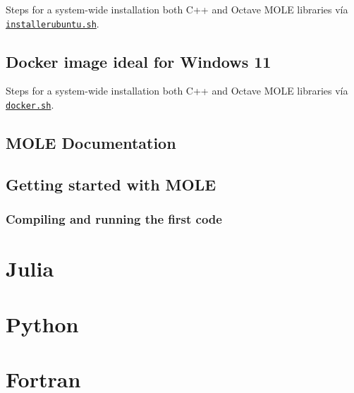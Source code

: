 \begin{listing}[ht!]
	\tiny
	\centering
	\caption{Steps for a system-wide installation both C++ and Octave
		MOLE libraries vía \href{https://raw.githubusercontent.com/carlosal1015/mole_examples/main/tutorial/installerubuntu.sh}{\texttt{installerubuntu.sh}}.}
	\label{code:installerubuntu.sh}
\end{listing}

\section{Docker image ideal for Windows 11}

\begin{listing}[ht!]
	\tiny
	\centering
	\caption{Steps for a system-wide installation both C++ and Octave
		MOLE libraries vía \href{https://raw.githubusercontent.com/carlosal1015/mole_examples/main/tutorial/docker.sh}{\texttt{docker.sh}}.}
	\label{code:docker.sh}
\end{listing}

\section{MOLE Documentation}

\section{Getting started with MOLE}

\subsection{Compiling and running the first code}

\chapter{Julia}

\chapter{Python}

\chapter{Fortran}

\nocite{*}
\printbibliography[title={References}]
